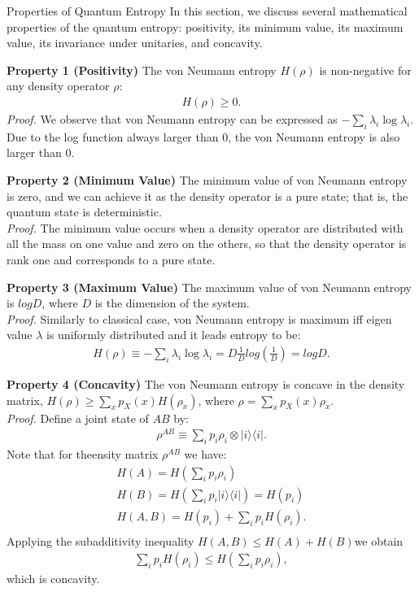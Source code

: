 \begin{subsection}{Properties of  Quantum Entropy}
In this section, we discuss several mathematical properties of the quantum entropy: positivity, its minimum value, its maximum value, its invariance under unitaries, and concavity.

\textbf{Property 1 (Positivity)} The von Neumann entropy $H(\rho)$ is non-negative for any density operator $\rho$:
\begin{align*}
H(\rho) \geq 0.
\end{align*}
\textit{Proof.} We observe that von Neumann entropy can be expressed as  $-\sum_{i} \lambda_i \log \lambda_i$. Due to the log function always larger than 0, the von Neumann entropy is also larger than 0.

\textbf{Property 2 (Minimum Value)}
The minimum value of von Neumann entropy is zero, and we can achieve it as the density operator is a pure state; that is, the quantum state is deterministic. \\
\textit{Proof.} The minimum value occurs when a density operator are distributed with all the mass on one value and zero on the others, so that the density operator is rank one and corresponds to a pure state.

\textbf{Property 3 (Maximum Value)}
The maximum value of von Neumann entropy is $logD$, where $D$ is the dimension of the system. \\
\textit{Proof.} Similarly to classical case, von Neumann entropy is maximum iff eigen value $\lambda$ is uniformly distributed and it leads entropy to be:
\begin{align*}
H(\rho) \equiv -\sum_{i} \lambda_i \log \lambda_i = D\frac{1}{D} log(\frac{1}{D})=logD.
\end{align*}

\textbf{Property 4 (Concavity)}
The von Neumann entropy is concave in the density matrix, $H(\rho) \geq \sum_x p_X(x) H(\rho_x)$, where $\rho = \sum_x p_X(x)\rho_x$. \\
\textit{Proof.} Define a joint state of $AB$ by:
\begin{align*}
\rho^{AB} \equiv \sum_i p_i \rho_i \otimes |i\rangle \langle i|.
\end{align*}
Note that for theensity matrix $\rho^{AB}$ we have:
\begin{align*}
H(A)=H(\sum_i p_i \rho_i) \\
H(B)=H(\sum_i p_i |i \rangle \langle i|)=H(p_i) \\
H(A,B)=H(p_i)+\sum_i p_i H(\rho_i). \\
\end{align*}
Applying the subadditivity inequality $H(A,B) \leq H(A)+H(B)$we obtain
\begin{align*}
\sum_i p_i H(\rho_i) \leq H(\sum_i p_i \rho_i),
\end{align*}
which is concavity.
\end{subsection}

